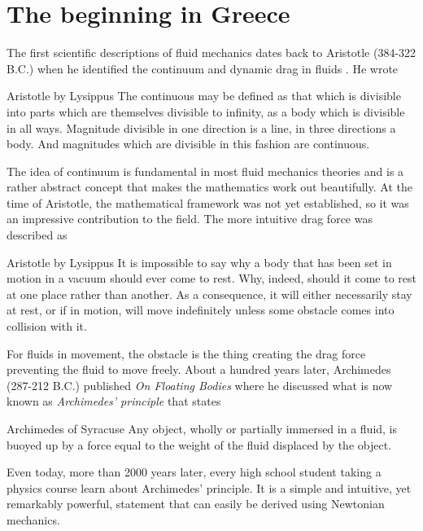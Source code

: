 \section{The beginning in Greece}
The first scientific descriptions of fluid mechanics dates back to Aristotle (384-322 B.C.) when he identified the continuum and dynamic drag in fluids \cite{anderson1998history}. He wrote
\begin{aquote}{Aristotle by Lysippus}
The continuous may be defined as that which is divisible into parts which are themselves divisible to infinity, as a body which is divisible in all ways. Magnitude divisible in one direction is a line, in three directions a body. And magnitudes which are divisible in this fashion are continuous. 
\end{aquote}
The idea of continuum is fundamental in most fluid mechanics theories and is a rather abstract concept that makes the mathematics work out beautifully. At the time of Aristotle, the mathematical framework was not yet established, so it was an impressive contribution to the field. The more intuitive drag force was described as
\begin{aquote}{Aristotle by Lysippus}
It is impossible to say why a body that has been set in motion in a vacuum should ever come to rest. Why, indeed, should it come to rest at one place rather than another. As a consequence, it will either necessarily stay at rest, or if in motion, will move indefinitely unless some obstacle comes into collision with it.
\end{aquote}
For fluids in movement, the obstacle is the thing creating the drag force preventing the fluid to move freely. About a hundred years later, Archimedes (287-212 B.C.) published \textit{On Floating Bodies} where he discussed what is now known as \textit{Archimedes' principle} that states
\begin{aquote}{Archimedes of Syracuse}
Any object, wholly or partially immersed in a fluid, is buoyed up by a force equal to the weight of the fluid displaced by the object.
\end{aquote}
Even today, more than 2000 years later, every high school student taking a physics course learn about Archimedes' principle. It is a simple and intuitive, yet remarkably powerful, statement that can easily be derived using Newtonian mechanics. 

